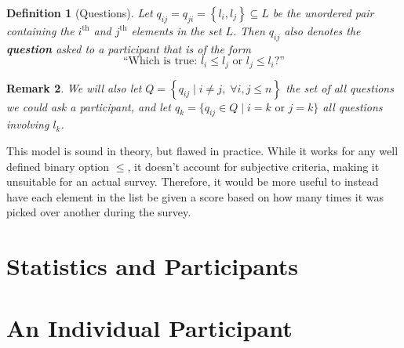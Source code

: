 \documentclass[12pt]{book}
\theoremstyle{definitionstyle}
\newtheorem{definition}{Definition}[section]
\newtheorem{remark}[definition]{Remark}
\numberwithin{equation}{section}
\begin{document}
\vspace{0.5em}

\begin{definition}[Questions]
    Let $q_{ij}=q_{ji}=\left\{l_i,l_j\right\} \subseteq L$ be the unordered pair containing the $i^\text{th}$ and $j^\text{th}$ elements in the set $L$. Then $q_{ij}$ also denotes the \textbf{question} asked to a participant that is of the form $$\text{``Which is true: }l_i \leq l_j\text{ or }l_j \leq l_i\text{?''}$$
\end{definition}

\vspace{0.5em}

\begin{remark}
    We will also let $Q = \left\{q_{ij} \;|\; i \neq j, \;\forall i,j\leq n\right\}$ the set of all questions we could ask a participant, and let $q_k=\{q_{ij}\in Q \;|\; i = k \text{ or } j = k\}$ all questions involving $l_k$.
\end{remark}

\vspace{1em}

This model is sound in theory, but flawed in practice. While it works for any well defined binary option $\leq$, it doesn't account for subjective criteria, making it unsuitable for an actual survey. Therefore, it would be more useful to instead have each element in the list be given a score based on how many times it was picked over another during the survey.

\newpage
\section{Statistics and Participants}

%
%


\newpage
\section{An Individual Participant}
\end{document}
